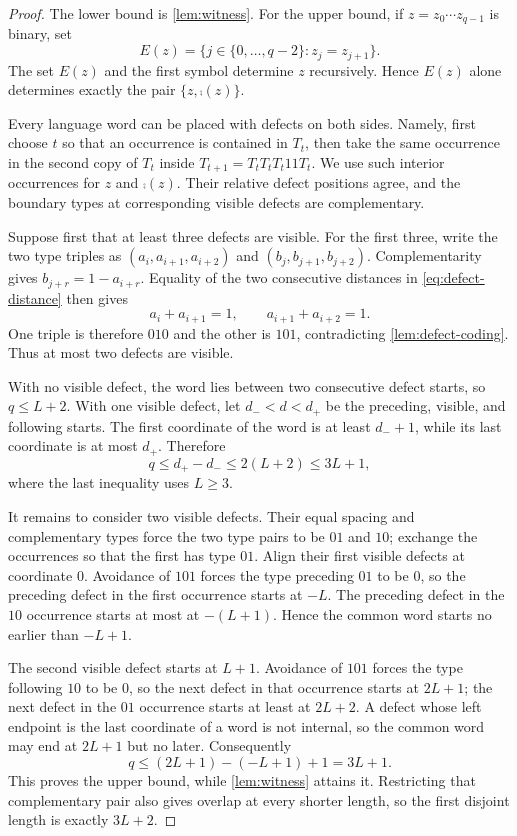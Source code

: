 \begin{proof}
The lower bound is \cref{lem:witness}.  For the upper bound, if
$z=z_0\cdots z_{q-1}$ is binary, set
\[
 E(z)=\{j\in\{0,\ldots,q-2\}:z_j=z_{j+1}\}.
\]
The set $E(z)$ and the first symbol determine $z$ recursively.  Hence
$E(z)$ alone determines exactly the pair $\{z,\comp(z)\}$.

Every language word can be placed with defects on both sides.  Namely, first
choose $t$ so that an occurrence is contained in $T_t$, then take the same
occurrence in the second copy of $T_t$ inside
$T_{t+1}=T_tT_tT_t11T_t$.  We use such interior occurrences for $z$ and
$\comp(z)$.  Their relative defect positions agree, and the boundary types
at corresponding visible defects are complementary.

Suppose first that at least three defects are visible.  For the first three,
write the two type triples as
$(a_i,a_{i+1},a_{i+2})$ and $(b_j,b_{j+1},b_{j+2})$.  Complementarity gives
$b_{j+r}=1-a_{i+r}$.  Equality of the two consecutive distances in
\eqref{eq:defect-distance} then gives
\[
 a_i+a_{i+1}=1,
 \qquad a_{i+1}+a_{i+2}=1.
\]
One triple is therefore $010$ and the other is $101$, contradicting
\cref{lem:defect-coding}.  Thus at most two defects are visible.

With no visible defect, the word lies between two consecutive defect starts,
so $q\leq L+2$.  With one visible defect, let $d_-<d<d_+$ be the preceding,
visible, and following starts.  The first coordinate of the word is at least
$d_-+1$, while its last coordinate is at most $d_+$.  Therefore
\begin{equation}\label{eq:one-defect-bound}
 q\leq d_+-d_-\leq2(L+2)\leq3L+1,
\end{equation}
where the last inequality uses $L\geq3$.

It remains to consider two visible defects.  Their equal spacing and
complementary types force the two type pairs to be $01$ and $10$; exchange
the occurrences so that the first has type $01$.  Align their first visible
defects at coordinate $0$.  Avoidance of $101$ forces the type preceding
$01$ to be $0$, so the preceding defect in the first occurrence starts at
$-L$.  The preceding defect in the $10$ occurrence starts at most at
$-(L+1)$.  Hence the common word starts no earlier than $-L+1$.

The second visible defect starts at $L+1$.  Avoidance of $101$ forces the
type following $10$ to be $0$, so the next defect in that occurrence starts
at $2L+1$; the next defect in the $01$ occurrence starts at least at
$2L+2$.  A defect whose left endpoint is the last coordinate of a word is
not internal, so the common word may end at $2L+1$ but no later.  Consequently
\[
 q\leq(2L+1)-(-L+1)+1=3L+1.
\]
This proves the upper bound, while \cref{lem:witness} attains it.  Restricting
that complementary pair also gives overlap at every shorter length, so the
first disjoint length is exactly $3L+2$.
\end{proof}

